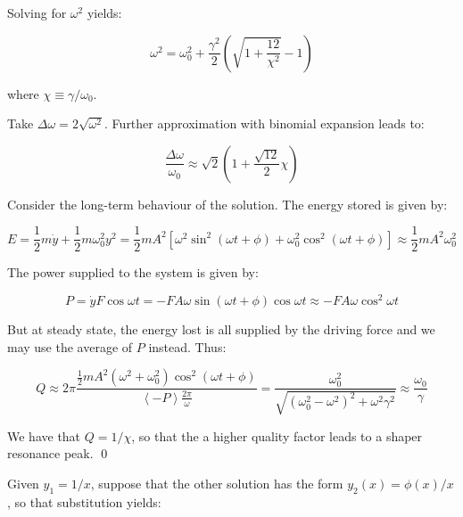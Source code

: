\documentclass[12pt]{article}
\begin{document}
Solving for $\omega^{2}$ yields:

\begin{equation}
    \omega^{2} = \omega_{0}^{2} + \frac{\gamma^{2}}{2} \left( \sqrt{1 + \frac{12}{\chi^{2}}} - 1 \right)
\end{equation}

where $\chi \equiv \gamma/\omega_{0}$.

Take $\Delta \omega = 2 \sqrt{\omega^{2}}$. Further approximation with binomial expansion leads to:

\begin{equation}
    \frac{\Delta \omega}{\omega_{0}} \approx \sqrt{2} \left( 1 + \frac{\sqrt{12}}{2}\chi \right)
\end{equation}

Consider the long-term behaviour of the solution. The energy stored is given by:

\begin{equation}
    E = \frac{1}{2} m \dot{y} + \frac{1}{2} m \omega_{0}^{2} y^{2} = \frac{1}{2} m A^{2} [\omega^{2} \sin^{2}{(\omega t + \phi)} + \omega_{0}^{2} \cos^{2}{(\omega t + \phi)}] \approx \frac{1}{2} m A^{2} \omega_{0}^{2}
\end{equation}

The power supplied to the system is given by:

\begin{equation}
    P = \dot{y} F\cos{\omega t} = -F A \omega \sin{(\omega t + \phi)} \cos{\omega t} \approx -F A \omega \cos^{2}{\omega t}
\end{equation}

But at steady state, the energy lost is all supplied by the driving force and we may use the average of $P$ instead. Thus:

\begin{equation}
    Q \approx 2\pi \frac{\frac{1}{2} m A^{2} (\omega^{2} + \omega_{0}^{2}) \cos^{2}{(\omega t + \phi)}}{\left\langle -P \right\rangle \frac{2\pi}{\omega}} = \frac{\omega_{0}^{2}}{\sqrt{(\omega_{0}^{2} - \omega^{2})^{2} + \omega^{2} \gamma^{2}}} \approx \frac{\omega_{0}}{\gamma}
\end{equation}

We have that $Q = 1/\chi$, so that the a higher quality factor leads to a shaper resonance peak.
\qed



Given $y_{1} = 1/x$, suppose that the other solution has the form $y_{2}(x) = \phi(x)/x$, so that substitution yields:
\end{document}
